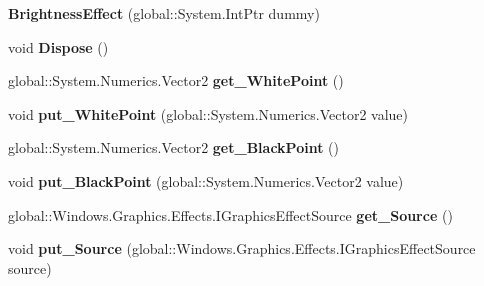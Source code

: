 \begin{DoxyCompactItemize}
{\bfseries Brightness\+Effect} (global\+::\+System.\+Int\+Ptr dummy)
\item 
\mbox{\label{class_microsoft_1_1_graphics_1_1_canvas_1_1_effects_1_1_brightness_effect_afaaded4b2565482485f12b97a40a0da8}} 
void {\bfseries Dispose} ()
\item 
\mbox{\label{class_microsoft_1_1_graphics_1_1_canvas_1_1_effects_1_1_brightness_effect_af8c1beaca4eb324bb24eaae396efa916}} 
global\+::\+System.\+Numerics.\+Vector2 {\bfseries get\+\_\+\+White\+Point} ()
\item 
\mbox{\label{class_microsoft_1_1_graphics_1_1_canvas_1_1_effects_1_1_brightness_effect_acedd43ed76b47e67db67b3b351732d75}} 
void {\bfseries put\+\_\+\+White\+Point} (global\+::\+System.\+Numerics.\+Vector2 value)
\item 
\mbox{\label{class_microsoft_1_1_graphics_1_1_canvas_1_1_effects_1_1_brightness_effect_ac7be5f6aa71740a4754dfbdeb1fc3515}} 
global\+::\+System.\+Numerics.\+Vector2 {\bfseries get\+\_\+\+Black\+Point} ()
\item 
\mbox{\label{class_microsoft_1_1_graphics_1_1_canvas_1_1_effects_1_1_brightness_effect_ace38eda2b5d63e091a80c2ca5ce0c214}} 
void {\bfseries put\+\_\+\+Black\+Point} (global\+::\+System.\+Numerics.\+Vector2 value)
\item 
\mbox{\label{class_microsoft_1_1_graphics_1_1_canvas_1_1_effects_1_1_brightness_effect_a7b0bb58e7e2d295dbbf1915014ecf6a7}} 
global\+::\+Windows.\+Graphics.\+Effects.\+I\+Graphics\+Effect\+Source {\bfseries get\+\_\+\+Source} ()
\item 
\mbox{\label{class_microsoft_1_1_graphics_1_1_canvas_1_1_effects_1_1_brightness_effect_a1b63503e02351c27c159def6ef491a70}} 
void {\bfseries put\+\_\+\+Source} (global\+::\+Windows.\+Graphics.\+Effects.\+I\+Graphics\+Effect\+Source source)

\end{DoxyCompactItemize}
